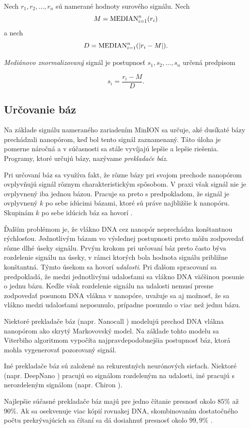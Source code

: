 \begin{definicia}
Nech $r_1, r_2, \dots, r_n$ sú namerané hodnoty surového signálu. Nech
 $$M = \median{i=1}{n}(r_i)$$ a nech $$D = \median{i=1}{n}(\abs*{r_i - M}) \text{.}$$

\emph{Mediánovo znormalizovaný} signál je postupnosť $s_1, s_2, \dots, s_n$ určená predpisom

$$s_i = \frac{r_i - M}{D} \text{.}$$

\end{definicia}

\subsection{Určovanie báz}

Na základe signálu nameraného zariadením MinION sa určuje, aké dusíkaté bázy prechádzali nanopórom, keď bol
tento signál zaznamenaný. Táto úloha je pomerne náročná a v súčasnosti sa stále vyvíjajú lepšie a
lepšie riešenia. Programy, ktoré určujú bázy, nazývame \emph{prekladače báz}.

Pri určovaní báz sa využíva fakt, že rôzne bázy pri svojom prechode nanopórom ovplyvňujú signál
rôznym charakteristickým spôsobom. V praxi však signál nie je ovplyvnený iba jednou bázou. Pracuje
sa preto s predpokladom, že signál je ovplyvnený $k$ po sebe idúcimi bázami, ktoré sú práve najbližšie
k nanopóru. Skupinám $k$ po sebe idúcich báz sa hovorí \emph{}.

Ďalším problémom je, že vlákno DNA cez nanopór neprechádza konštantnou rýchlosťou. Jednotlivým bázam vo 
výslednej postupnosti preto môžu zodpovedať rôzne dlhé úseky signálu. Prvým krokom pri určovaní báz 
preto často býva rozdelenie signálu na úseky, v rámci ktorých bola hodnota signálu približne konštantná.
Týmto úsekom sa hovorí \emph{udalosti}. Pri ďalšom spracovaní sa predpokladá, že medzi jednotlivými 
udalosťami sa vlákno DNA väčšinou posunie o jednu bázu. Keďže však rozdelenie signálu na udalosti nemusí
presne zodpovedať posunom DNA vlákna v nanopóre, uvažuje sa aj možnosť, že sa vlákno medzi udalosťami 
neposunulo, prípadne posunulo o viac než jednu bázu.

Niektoré prekladače báz (napr. Nanocall \cite{Nanocall2017}) modelujú prechod DNA vlákna nanopórom ako 
skrytý Markovovský model. Na základe tohto
modelu sa Viterbiho algoritmom vypočíta najpravdepodobnejšia postupnosť báz, ktorá mohla vygenerovať 
pozorovaný signál.

Iné prekladače báz sú založené na rekurentných neurónových sieťach. Niektoré (napr. DeepNano 
\cite{DeepNano2017}) pracujú so signálom rozdeleným na udalosti, iné pracujú s nerozdeleným signálom 
(napr. Chiron \cite{Chiron2017}).

Najlepšie súčasné prekladače báz majú pre jedno čítanie presnosť okolo $85\%$ až $90\%$. Ak sa osekvenuje viac kópií rovnakej DNA, skombinovaním dostatočného počtu prekrývajúcich sa čítaní sa dá dosiahnuť presnosť okolo $99,9\%$ \cite{BasecallerComparison}.
